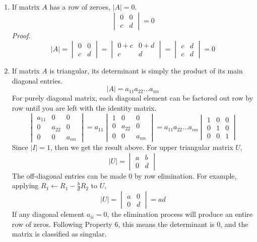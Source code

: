 \documentclass[../linear-algebra.tex]{subfiles}
\begin{document}
\begin{enumerate}
    \item If matrix $A$ has a row of zeroes, $|A|=0$.
    \[\begin{vmatrix} 0 & 0 \\ c & d \end{vmatrix} = 0\]
    \textit{Proof.}
    \[|A| = \begin{vmatrix} 0 & 0 \\ c & d \end{vmatrix} = \begin{vmatrix} 0 + c & 0 + d \\ c & d \end{vmatrix} = \begin{vmatrix} c & d \\ c & d \end{vmatrix} = 0\]

    \item If matrix $A$ is triangular, its determinant is simply the product of its main diagonal entries.
    \[|A| = a_{11}a_{22} \dots a_{nn}\]
    For purely diagonal matrix, each diagonal element can be factored out row by row until you are left with the identity matrix.
    \[\begin{vmatrix} a_{11} & 0 & 0 \\ 0 & a_{22} & 0 \\ 0 & 0 & a_{nn} \end{vmatrix} = a_{11} \begin{vmatrix} 1 & 0 & 0 \\ 0 & a_{22} & 0 \\ 0 & 0 & a_{nn} \end{vmatrix} = a_{11}a_{22} \dots a_{nn} \begin{vmatrix} 1 & 0 & 0 \\ 0 & 1 & 0 \\ 0 & 0 & 1 \end{vmatrix}\]
    Since $|I| = 1$, then we get the result above.\newline
    For upper triangular matrix $U$,
    \[|U| = \begin{vmatrix} a & b \\ 0 & d \end{vmatrix}\]
    The off-diagonal entries can be made 0 by row elimination. For example, applying $R_1 \leftarrow R_1 - \frac{b}{d}R_2$ to $U$,
    \[|U| = \begin{vmatrix} a & 0 \\ 0 & d \end{vmatrix} = ad\]
    If any diagonal element $a_{ii} = 0$, the elimination process will produce an entire row of zeros. Following Property 6, this means the determinant is $0$, and the matrix is classified as singular.


\end{enumerate}
\end{document}
